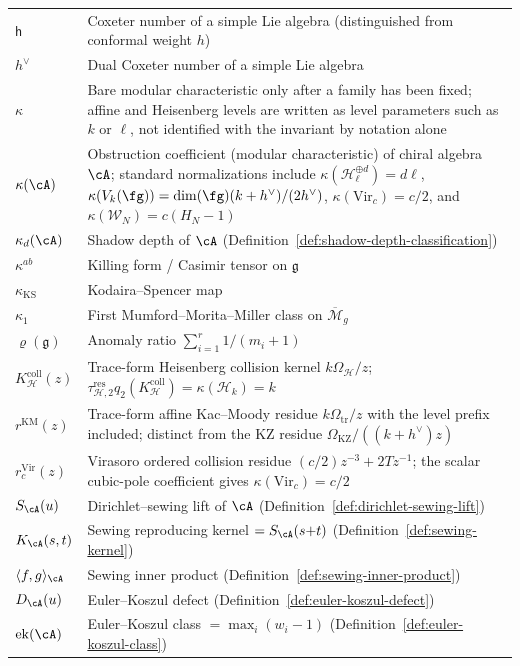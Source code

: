 \begin{longtable}{p{3cm} p{10cm}}
$\mathsf{h}$ & Coxeter number of a simple Lie algebra (distinguished from conformal weight $h$) \\
%
$h^\vee$ & Dual Coxeter number of a simple Lie algebra \\
$\kappa$ & Bare modular characteristic only after a family has been fixed; affine and Heisenberg levels are written as level parameters such as $k$ or $\ell$, not identified with the invariant by notation alone \\
$\kappa(\cA)$ & Obstruction coefficient (modular characteristic) of chiral algebra $\cA$; standard normalizations include $\kappa(\mathcal H_\ell^{\oplus d})=d\ell$, $\kappa(V_k(\fg))=\dim(\fg)(k+h^\vee)/(2h^\vee)$, $\kappa(\mathrm{Vir}_c)=c/2$, and $\kappa(\mathcal W_N)=c(H_N-1)$ \\
$\kappa_d(\cA)$ & Shadow depth of $\cA$ (Definition~\ref{def:shadow-depth-classification}) \\
$\kappa^{ab}$ & Killing form / Casimir tensor on $\mathfrak{g}$ \\
$\kappa_{\mathrm{KS}}$ & Kodaira--Spencer map \\
%
$\kappa_1$ & First Mumford--Morita--Miller class on $\overline{\mathcal{M}}_g$ \\
$\varrho(\mathfrak{g})$ & Anomaly ratio $\sum_{i=1}^r 1/(m_i+1)$ \\
$K_{\mathcal H}^{\mathrm{coll}}(z)$ & Trace-form Heisenberg collision kernel $k\Omega_{\mathcal H}/z$; $\tau_{\mathcal H,2}^{\mathrm{res}}q_2(K_{\mathcal H}^{\mathrm{coll}})=\kappa(\mathcal H_k)=k$ \\
$r^{\mathrm{KM}}(z)$ & Trace-form affine Kac--Moody residue $k\Omega_{\mathrm{tr}}/z$ with the level prefix included; distinct from the KZ residue $\Omega_{\mathrm{KZ}}/((k+h^\vee)z)$ \\
$r^{\mathrm{Vir}}_c(z)$ & Virasoro ordered collision residue $(c/2)z^{-3}+2Tz^{-1}$; the scalar cubic-pole coefficient gives $\kappa(\mathrm{Vir}_c)=c/2$ \\
%
$S_\cA(u)$ & Dirichlet--sewing lift of $\cA$ (Definition~\ref{def:dirichlet-sewing-lift}) \\
$K_\cA(s,t)$ & Sewing reproducing kernel $= S_\cA(s{+}t)$ (Definition~\ref{def:sewing-kernel}) \\
$\langle f, g \rangle_\cA$ & Sewing inner product (Definition~\ref{def:sewing-inner-product}) \\
$D_\cA(u)$ & Euler--Koszul defect (Definition~\ref{def:euler-koszul-defect}) \\
$\operatorname{ek}(\cA)$ & Euler--Koszul class $= \max_i(w_i - 1)$ (Definition~\ref{def:euler-koszul-class}) \\

\end{longtable}
